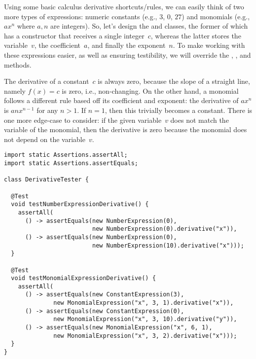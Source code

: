 Using some basic calculus derivative shortcuts/rules, we can easily think of two more types of expressions: numeric constants (e.g., $3$, $0$, $27$) and monomials (e.g., $ax^n$ where $a, n$ are integers). 
So, let's design the  and  classes, the former of which has a constructor that receives a single integer~$c$, whereas the latter stores the variable~$v$, the coefficient~$a$, and finally the exponent~$n$. 
To make working with these expressions easier, as well as ensuring testibility, we will override the , , and  methods.

The derivative of a constant~$c$ is always zero, because the slope of a straight line, namely $f(x) = c$ is zero, i.e., non-changing. 
On the other hand, a monomial follows a different rule based off its coefficient and exponent: the derivative of $ax^n$ is $anx^{n-1}$ for any $n > 1$. 
If $n=1$, then this trivially becomes a constant. 
There is one more edge-case to consider: if the given variable~$v$ does not match the variable of the monomial, then the derivative is zero because the monomial does not depend on the variable~$v$.

\begin{lstlisting}[language=MyJava]
import static Assertions.assertAll;
import static Assertions.assertEquals;

class DerivativeTester {

  @Test
  void testNumberExpressionDerivative() {
    assertAll(
      () -> assertEquals(new NumberExpression(0),
                         new NumberExpression(0).derivative("x")),
      () -> assertEquals(new NumberExpression(0),
                         new NumberExpression(10).derivative("x")));
  }

  @Test
  void testMonomialExpressionDerivative() {
    assertAll(
      () -> assertEquals(new ConstantExpression(3),
              new MonomialExpression("x", 3, 1).derivative("x")),
      () -> assertEquals(new ConstantExpression(0),
              new MonomialExpression("x", 3, 10).derivative("y")),
      () -> assertEquals(new MonomialExpression("x", 6, 1),
              new MonomialExpression("x", 3, 2).derivative("x")));
  }
}
\end{lstlisting}


